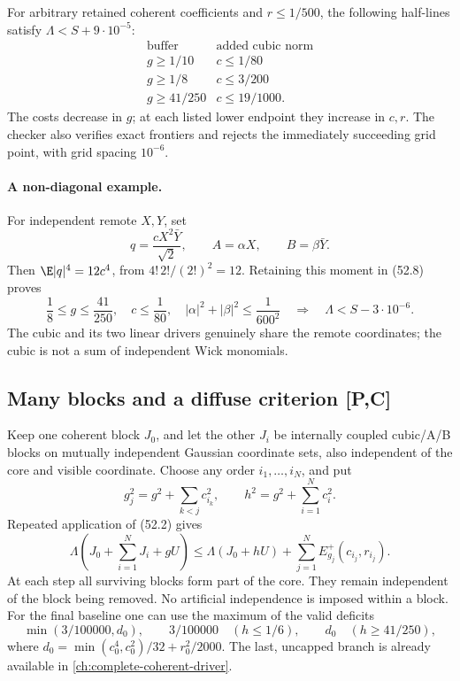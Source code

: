 For arbitrary retained coherent coefficients and \(r\le1/500\),
the following half-lines satisfy \(\Lambda<S+9\cdot10^{-5}\):
\[
\begin{array}{c|c}
 \text{buffer}&\text{added cubic norm}\\ \hline
 g\ge1/10&c\le1/80\\
 g\ge1/8&c\le3/200\\
 g\ge41/250&c\le19/1000.
\end{array}
\tag{52.10}
\]
The costs decrease in \(g\); at each listed lower endpoint they
increase in \(c,r\). The checker also verifies exact frontiers and
rejects the immediately succeeding grid point, with grid spacing
\(10^{-6}\).

\paragraph{A non-diagonal example.}
For independent remote \(X,Y\), set
\[
 q=\frac{cX^2\bar Y}{\sqrt2},\qquad A=\alpha X,\qquad B=\beta\bar Y.
\]
Then \(\E|q|^4=12c^4\), from \(4!\,2!/(2!)^2=12\).
Retaining this moment in (52.8) proves
\[
 \frac18\le g\le\frac{41}{250},\quad
 c\le\frac1{80},\quad
 |\alpha|^2+|\beta|^2\le\frac1{600^2}
 \quad\Longrightarrow\quad\Lambda<S-3\cdot10^{-6}.
 \tag{52.11}
\]
The cubic and its two linear drivers genuinely share the remote
coordinates; the cubic is not a sum of independent Wick monomials.

\subsection{Many blocks and a diffuse criterion [P,C]}
Keep one coherent block \(J_0\), and let the other \(J_i\) be internally
coupled cubic/A/B blocks on mutually independent Gaussian coordinate
sets, also independent of the core and visible coordinate.
Choose any order \(i_1,\ldots,i_N\), and put
\[
 g_j^2=g^2+\sum_{k<j}c_{i_k}^2,\qquad
 h^2=g^2+\sum_{i=1}^N c_i^2.
\]
Repeated application of (52.2) gives
\[
 \boxed{\Lambda\left(J_0+\sum_{i=1}^NJ_i+gU\right)
 \le\Lambda(J_0+hU)+\sum_{j=1}^NE^+_{g_j}(c_{i_j},r_{i_j}).}
 \tag{52.12}
\]
At each step all surviving blocks form part of the core. They remain
independent of the block being removed. No artificial independence
is imposed within a block.
For the final baseline one can use the maximum of the valid deficits
\[
 \min(3/100000,d_0),\qquad
 3/100000\quad(h\le1/6),\qquad
 d_0\quad(h\ge41/250),
\]
where \(d_0=\min(c_0^4,c_0^2)/32+r_0^2/2000\).
The last, uncapped branch is already available in \autoref{ch:complete-coherent-driver}.

